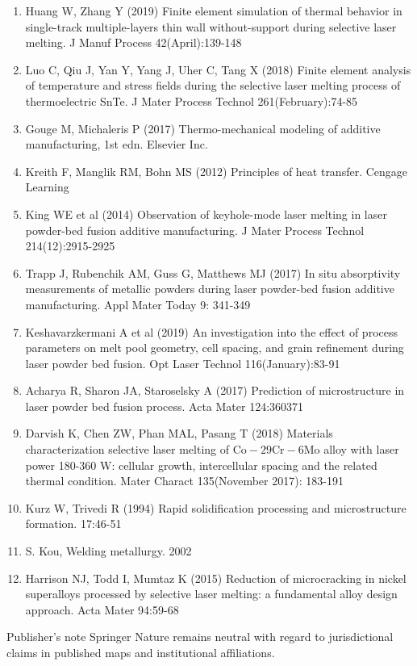 \documentclass[10pt]{article}
\begin{document}
\begin{enumerate}
  \item Huang W, Zhang Y (2019) Finite element simulation of thermal behavior in single-track multiple-layers thin wall without-support during selective laser melting. J Manuf Process 42(April):139-148

  \item Luo C, Qiu J, Yan Y, Yang J, Uher C, Tang X (2018) Finite element analysis of temperature and stress fields during the selective laser melting process of thermoelectric SnTe. J Mater Process Technol 261(February):74-85

  \item Gouge M, Michaleris P (2017) Thermo-mechanical modeling of additive manufacturing, 1st edn. Elsevier Inc.

  \item Kreith F, Manglik RM, Bohn MS (2012) Principles of heat transfer. Cengage Learning

  \item King WE et al (2014) Observation of keyhole-mode laser melting in laser powder-bed fusion additive manufacturing. J Mater Process Technol 214(12):2915-2925

  \item Trapp J, Rubenchik AM, Guss G, Matthews MJ (2017) In situ absorptivity measurements of metallic powders during laser powder-bed fusion additive manufacturing. Appl Mater Today 9: 341-349

  \item Keshavarzkermani A et al (2019) An investigation into the effect of process parameters on melt pool geometry, cell spacing, and grain refinement during laser powder bed fusion. Opt Laser Technol 116(January):83-91

  \item Acharya R, Sharon JA, Staroselsky A (2017) Prediction of microstructure in laser powder bed fusion process. Acta Mater 124:360371

  \item Darvish K, Chen ZW, Phan MAL, Pasang T (2018) Materials characterization selective laser melting of $\mathrm{Co}-29 \mathrm{Cr}-6 \mathrm{Mo}$ alloy with laser power 180-360 W: cellular growth, intercellular spacing and the related thermal condition. Mater Charact 135(November 2017): 183-191

  \item Kurz W, Trivedi R (1994) Rapid solidification processing and microstructure formation. 17:46-51

  \item S. Kou, Welding metallurgy. 2002

  \item Harrison NJ, Todd I, Mumtaz K (2015) Reduction of microcracking in nickel superalloys processed by selective laser melting: a fundamental alloy design approach. Acta Mater 94:59-68

\end{enumerate}

Publisher's note Springer Nature remains neutral with regard to jurisdictional claims in published maps and institutional affiliations.
\end{document}
